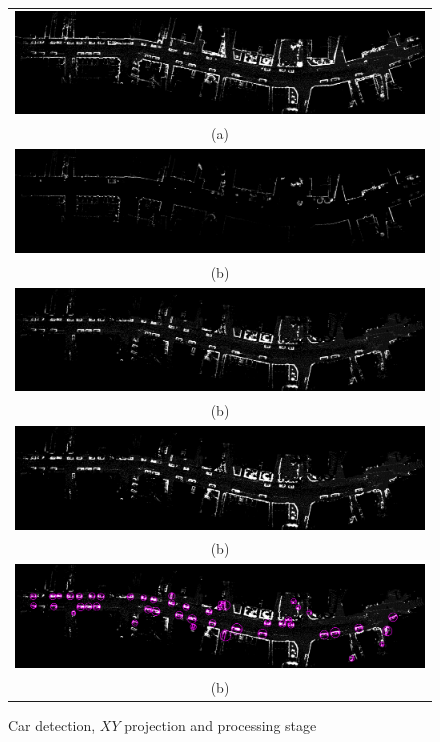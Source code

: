 \begin{figure}[tp]
 \centering
    \begin{tabular}{c}
    \includegraphics[width=0.98\columnwidth]{./img/ch-laser/pointsprojected}\\
    (a)\\
  \includegraphics[width=0.98\columnwidth]{./img/ch-laser/heightimagePointsProjected_.png}\\
    (b)\\
  \includegraphics[width=0.98\columnwidth]{./img/ch-laser/pointsprojectedFiltered.png}\\
    (b)\\
  \includegraphics[width=0.98\columnwidth]{./img/ch-laser/pointsprojectedEroded.png}\\
    (b)\\
    \includegraphics[width=0.98\columnwidth]{./img/ch-laser/pointsprojectedErodedWithBoundingBoxes.png}\\
    (b)
 \end{tabular}
 \caption{Car detection, $XY$ projection and processing stage}
 \label{fig:cardetection}
\end{figure}




